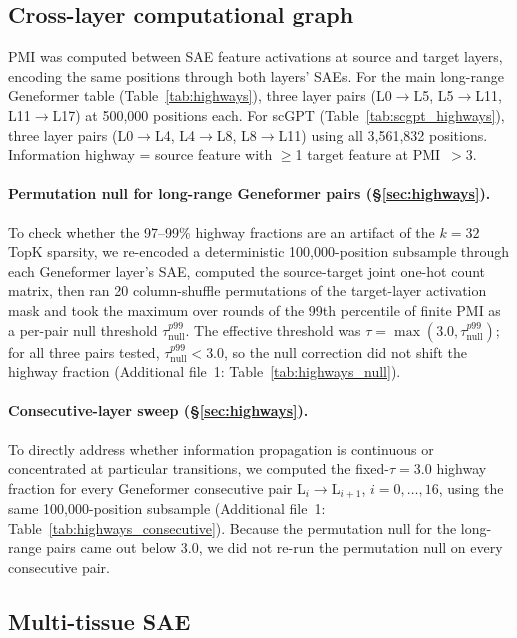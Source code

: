 \documentclass[onecolumn]{article}
\begin{document}
\subsection{Cross-layer computational graph}

PMI was computed between SAE feature activations at source and target layers, encoding the same positions through both layers' SAEs. For the main long-range Geneformer table (Table~\ref{tab:highways}), three layer pairs (L0$\to$L5, L5$\to$L11, L11$\to$L17) at 500{,}000 positions each. For scGPT (Table~\ref{tab:scgpt_highways}), three layer pairs (L0$\to$L4, L4$\to$L8, L8$\to$L11) using all 3{,}561{,}832 positions. Information highway = source feature with $\geq$1 target feature at PMI~$> 3$.

\paragraph{Permutation null for long-range Geneformer pairs (\S\ref{sec:highways}).} To check whether the 97--99\% highway fractions are an artifact of the $k{=}32$ TopK sparsity, we re-encoded a deterministic 100{,}000-position subsample through each Geneformer layer's SAE, computed the source-target joint one-hot count matrix, then ran 20 column-shuffle permutations of the target-layer activation mask and took the maximum over rounds of the 99th percentile of finite PMI as a per-pair null threshold $\tau_{\text{null}}^{p99}$. The effective threshold was $\tau = \max(3.0, \tau_{\text{null}}^{p99})$; for all three pairs tested, $\tau_{\text{null}}^{p99} < 3.0$, so the null correction did not shift the highway fraction (Additional file~1: Table~\ref{tab:highways_null}).

\paragraph{Consecutive-layer sweep (\S\ref{sec:highways}).} To directly address whether information propagation is continuous or concentrated at particular transitions, we computed the fixed-$\tau{=}3.0$ highway fraction for every Geneformer consecutive pair L$_{i}$$\to$L$_{i+1}$, $i = 0, \ldots, 16$, using the same 100{,}000-position subsample (Additional file~1: Table~\ref{tab:highways_consecutive}). Because the permutation null for the long-range pairs came out below 3.0, we did not re-run the permutation null on every consecutive pair.

\subsection{Multi-tissue SAE}
\end{document}
